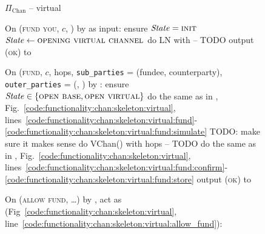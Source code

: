 \begin{figure}[H]
  \begin{protocolbox}{$\Pi_{\mathrm{Chan}}$ -- virtual}
    \begin{algorithmic}[1]
      \State {}
      \State {}
      \State On (\textsc{fund you}, $c$, \bob) by \charlie as input:
      \Indent
        \State ensure $\mathit{State} = \textsc{init}$
        \State $\mathit{State} \gets \textsc{opening virtual channel}$
        \State do LN with \bob{} -- TODO
        \State output (\textsc{ok}) to \charlie
      \EndIndent
      \Statex

      \State On (\textsc{fund}, $c$, hops, \texttt{sub\_parties} = (fundee,
      counterparty), \texttt{outer\_parties} = (\charlie, \dave) by
      \environment:
      \Indent
        \State ensure $\mathit{State} \in \{\textsc{open base}, \textsc{open
        virtual}\}$
        \State do the same as in \fchan,
        Fig.~\ref{code:functionality:chan:skeleton:virtual},
        lines~\ref{code:functionality:chan:skeleton:virtual:fund}-\ref{code:functionality:chan:skeleton:virtual:fund:simulate}
        TODO: make sure it makes sense
        \State do VChan() with hops -- TODO 
        \label{code:protocol:chan:skeleton:vchan}
        \State do the same as in \fchan,
        Fig.~\ref{code:functionality:chan:skeleton:virtual},
        lines~\ref{code:functionality:chan:skeleton:virtual:fund:confirm}-\ref{code:functionality:chan:skeleton:virtual:fund:store}
        \State output (\textsc{ok}) to \environment
      \EndIndent
      \Statex

      \State {}
      \State On (\textsc{allow fund}, \dots) by \charlie, act as \fchan
      (Fig~\ref{code:functionality:chan:skeleton:virtual},
      line~\ref{code:functionality:chan:skeleton:virtual:allow_fund}):
    \end{algorithmic}
  \end{protocolbox}
  \caption{}
  \label{code:protocol:chan:skeleton:virtual}
\end{figure}
